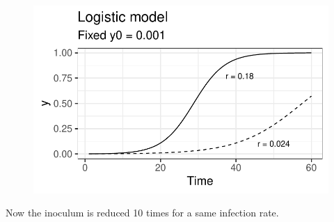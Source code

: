 \documentclass[
  letterpaper,
  DIV=11,
  numbers=noendperiod]{scrreprt}
\begin{document}
\begin{figure}[H]

{\centering \includegraphics{./temporal-models_files/figure-pdf/unnamed-chunk-14-1.pdf}

}

\end{figure}

Now the inoculum is reduced 10 times for a same infection rate.
\end{document}
